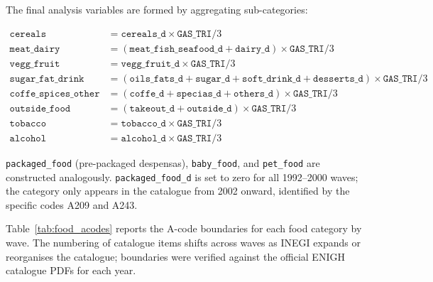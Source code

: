 The final analysis variables are formed by aggregating sub-categories:

\begin{align*}
\texttt{cereals}          &= \texttt{cereals\_d} \times \texttt{GAS\_TRI}/3 \\
\texttt{meat\_dairy}      &= (\texttt{meat\_fish\_seafood\_d} + \texttt{dairy\_d})
                              \times \texttt{GAS\_TRI}/3 \\
\texttt{vegg\_fruit}      &= \texttt{vegg\_fruit\_d} \times \texttt{GAS\_TRI}/3 \\
\texttt{sugar\_fat\_drink}&= (\texttt{oils\_fats\_d} + \texttt{sugar\_d}
                              + \texttt{soft\_drink\_d} + \texttt{desserts\_d})
                              \times \texttt{GAS\_TRI}/3 \\
\texttt{coffe\_spices\_other} &= (\texttt{coffe\_d} + \texttt{specias\_d}
                              + \texttt{others\_d}) \times \texttt{GAS\_TRI}/3 \\
\texttt{outside\_food}    &= (\texttt{takeout\_d} + \texttt{outside\_d})
                              \times \texttt{GAS\_TRI}/3 \\
\texttt{tobacco}          &= \texttt{tobacco\_d} \times \texttt{GAS\_TRI}/3 \\
\texttt{alcohol}          &= \texttt{alcohol\_d} \times \texttt{GAS\_TRI}/3
\end{align*}

\noindent
\texttt{packaged\_food} (pre-packaged despensas), \texttt{baby\_food}, and
\texttt{pet\_food} are constructed analogously. \texttt{packaged\_food\_d} is
set to zero for all 1992--2000 waves; the category only appears in the
catalogue from 2002 onward, identified by the specific codes A209 and A243.

Table~\ref{tab:food_acodes} reports the A-code boundaries for each food
category by wave. The numbering of catalogue items shifts across waves as INEGI
expands or reorganises the catalogue; boundaries were verified against the
official ENIGH catalogue PDFs for each year.

